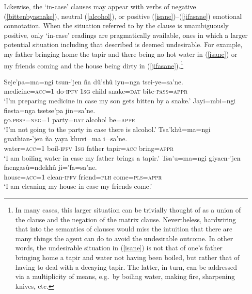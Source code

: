 \documentclass[output=paper,colorlinks,citecolor=brown]{langscibook}
\begin{document}
Likewise, the `in-case'  clauses may appear with verbs of negative (\ref{bittenbyasnake}), neutral (\ref{alcohol}), or positive (\ref{isane})--(\ref{jifasane}) emotional connotation. When the situation referred to by the  clause is unambiguously positive, only `in-case' readings are pragmatically available, \ie ones in which a larger potential situation including that described is deemed undesirable. {For example, my father bringing home the tapir and there being no hot water in (\ref{isane}) or my friends coming and the house being dirty in (\ref{jifasane}).}\footnote{{In many cases, this larger situation can be trivially thought of as a union of the  clause and the negation of the matrix clause. Nevertheless, hardwiring that into the semantics of  clauses would miss the intuition that there are many things the agent can do to avoid the undesirable outcome. In other words, the undesirable situation in (\ref{isane}) is not that of one's father bringing home a tapir and water not having been boiled, but rather that of having to deal with a decaying tapir. The latter, in turn, can be addressed via a multiplicity of means, e.g.\ by boiling water, making fire, sharpening knives, etc.}}
\begin{exe}
    \ex \label{bittenbyasnake} %
    \gll Seje'pa=ma=ngi      tsun-'jen  {\ob}ña    dû'shû iyu=nga       tsei-ye=sa'ne.{\cb} \\
         medicine=\textsc{acc=1}  do-\textsc{ipfv} \textsc{1sg} child      snake=\textsc{dat} {bite-\textsc{pass=appr}} \\
    \glt `I'm preparing medicine in case my son gets bitten by a snake.'   
    \ex \label{alcohol}
    \gll Jayi=mbi=ngi      fiesta=nga    {\ob}tsetse'pa jin=sa'ne.{\cb} \\
         go.\textsc{prsp=neg=1} party=\textsc{dat} alcohol   be=\textsc{appr} \\
    \glt `I'm not going to the party in case there is alcohol.'
    \ex \label{isane} %
    \gll Tsa'khû=ma=ngi guathian-'jen {\ob}ña    yaya   khuvi=ma      i=sa'ne.{\cb} \\
         water=\textsc{acc=1}  boil-\textsc{ipfv}  \textsc{1sg} father tapir=\textsc{acc} bring=\textsc{appr} \\
    \glt `I am boiling water in case my father brings a tapir.'
    \ex \label{jifasane} %
    \gll Tsa'u=ma=ngi    giyaen-'jen   {\ob}faengasû=ndekhû ji='fa=sa'ne.{\cb} \\
         house=\textsc{acc=1} clean-\textsc{ipfv} friend=\textsc{plh}      come=\textsc{pls=appr} \\
    \glt `I am cleaning my house in case my friends come.' 
\end{exe}
\end{document}
